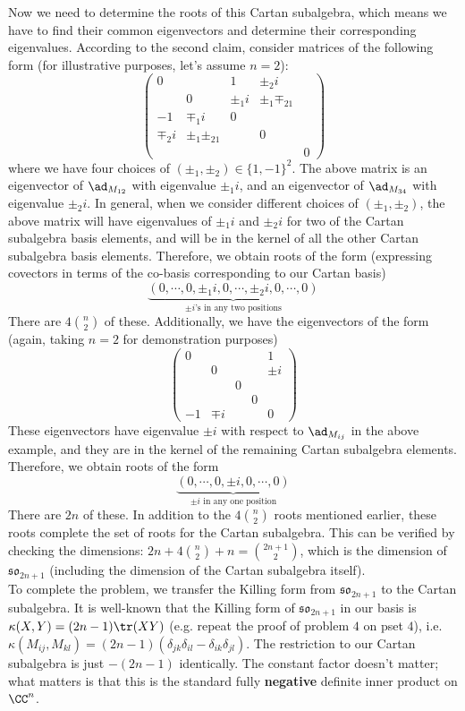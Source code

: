 \documentclass[11pt, headheight=30pt]{scrartcl}
\begin{document}
Now we need to determine the roots of this Cartan subalgebra, which means we have to find their common eigenvectors and determine their corresponding eigenvalues. According to the second claim, consider matrices of the following form (for illustrative purposes, let's assume $n=2$):
\[ 
\begin{pmatrix}
0&&1&\pm_2 i&\\
&0&\pm_1 i&\pm_1 \mp_21&\\
-1&\mp_1 i&0&&\\
\mp_2 i&\pm_1\pm_21&&0&\\
&&&& 0
\end{pmatrix}    
\]
where we have four choices of $(\pm_1,\pm_2) \in \{1,-1\}^2$. The above matrix is an eigenvector of $\ad_{M_{12}}$ with eigenvalue $\pm_1 i$, and an eigenvector of $\ad_{M_{34}}$ with eigenvalue $\pm_2 i$. In general, when we consider different choices of $(\pm_1,\pm_2)$, the above matrix will have eigenvalues of $\pm_1 i$ and $\pm_2 i$ for two of the Cartan subalgebra basis elements, and will be in the kernel of all the other Cartan subalgebra basis elements. Therefore, we obtain roots of the form (expressing covectors in terms of the co-basis corresponding to our Cartan basis)
\[ \underbrace{(0,\cdots , 0 , \pm_1 i , 0 , \cdots , \pm_2 i , 0 , \cdots , 0)}_{\pm i\text{'s in any two positions}} \tag{$\star$}\]
There are $4\binom{n}{2}$ of these. Additionally, we have the eigenvectors of the form
(again, taking $n=2$ for demonstration purposes)
\[ 
\begin{pmatrix}
0&&&&1\\
&0&&&\pm i\\
&&0&&\\
&&&0&\\
-1&\mp i&&&0
\end{pmatrix}
\]
These eigenvectors have eigenvalue $\pm i$ with respect to $\ad_{M_{ij}}$ in the above example, and they are in the kernel of the remaining Cartan subalgebra elements. Therefore, we obtain roots of the form
\[ \underbrace{(0,\cdots , 0 , \pm i , 0 , \cdots , 0)}_{\pm i\text{ in any one position}} \tag{$\star\star$}\]
There are $2n$ of these. In addition to the $4\binom{n}{2}$ roots mentioned earlier, these roots complete the set of roots for the Cartan subalgebra. This can be verified by checking the dimensions: $2n+4\binom{n}{2}+n = \binom{2n+1}{2}$, which is the dimension of $\mathfrak{so}_{2n+1}$ (including the dimension of the Cartan subalgebra itself).\\

To complete the problem, we transfer the Killing form
from $\mathfrak{so}_{2n+1}$ to the Cartan subalgebra.
It is well-known that the Killing form of $\mathfrak{so}_{2n + 1}$
in our basis is $\kappa(X,Y) = (2n-1)\tr(XY)$ (e.g. repeat the proof
of problem $4$ on pset $4$),
i.e. $\kappa(M_{ij}, M_{kl}) = (2n-1)\left(\delta_{jk}\delta_{il} - \delta_{ik}\delta_{jl}\right)$.
The restriction to our Cartan subalgebra is
just $-(2n-1)$ identically. The constant factor
doesn't matter; what matters is that this is the standard
fully \textbf{negative} definite inner product on $\CC^n$.
\end{document}
